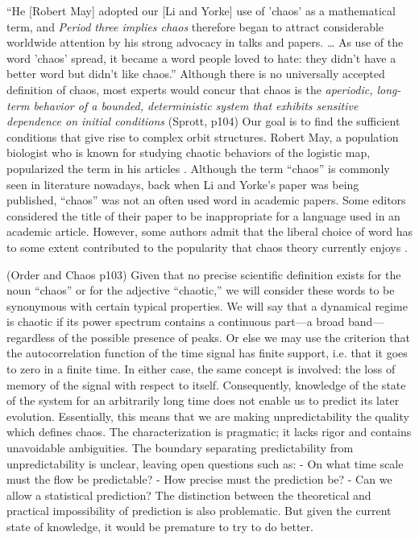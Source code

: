 \documentclass[10pt,twoside,draft]{book}
\begin{document}
``He [Robert May] adopted our [Li and Yorke] use of 'chaos' as a mathematical term, and \textit{Period three implies chaos} therefore began to attract considerable worldwide attention by his strong advocacy in talks and papers.
\ldots
As use of the word 'chaos' spread, it became a word people loved to hate: they didn't have a better word but didn't like chaos.''
\citep[205]{ueda-abraham}
Although there is no universally accepted definition of chaos, most experts would concur that chaos is the \textit{aperiodic, long-term behavior of a bounded, deterministic system that exhibits sensitive dependence on initial conditions} (Sprott, p104)
Our goal is to find the sufficient conditions that give rise to complex orbit structures.
Robert May, a population biologist who is known for studying chaotic behaviors of the logistic map, popularized the term in his articles \citeyearpar{may1,may2}.
Although the term ``chaos'' is commonly seen in literature nowadays, back when Li and Yorke's paper was being published, ``chaos'' was not an often used word in academic papers.
Some editors considered the title of their paper to be inappropriate for a language used in an academic article.
However, some authors admit that the liberal choice of word has to some extent contributed to the popularity that chaos theory currently enjoys \citep[``Exploring Chaos on an Interval'']{ueda-abraham}.

(Order and Chaos p103)
Given that no precise scientific definition exists for the noun ``chaos'' or for the adjective ``chaotic,'' we will consider these words to be synonymous with certain typical properties.
We will say that a dynamical regime is chaotic if its power spectrum contains a continuous part---a broad band---regardless of the possible presence of peaks.
Or else we may use the criterion that the autocorrelation function of the time signal has finite support, i.e. that it goes to zero in a finite time.
In either case, the same concept is involved: the loss of memory of the signal with respect to itself.
Consequently, knowledge of the state of the system for an arbitrarily long time does not enable us to predict its later evolution.
Essentially, this means that we are making unpredictability the quality which defines chaos.
The characterization is pragmatic; it lacks rigor and contains unavoidable ambiguities.
The boundary separating predictability from unpredictability is unclear, leaving open questions such as:
- On what time scale must the flow be predictable?
- How precise must the prediction be?
- Can we allow a statistical prediction?
The distinction between the theoretical and practical impossibility of prediction is also problematic.
But given the current state of knowledge, it would be premature to try to do better.
\end{document}
